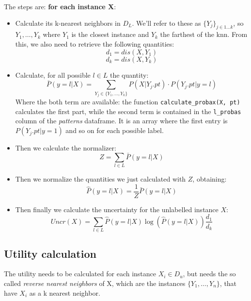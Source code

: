 The steps are: \textbf{for each instance X}:
\begin{itemize}
    \item Calculate its k-nearest neighbors in $D_L$. We'll refer to these as 
    $\{Y_j\}_{j\in 1\dots k}$, so ${Y_1, \dots, Y_k}$ where $Y_1$ is the closest instance and $Y_k$ the 
    farthest of the k\-nn.
    From this, we also need to retrieve the following quantities:
    \begin{equation}
        d_1 = dis(X, Y_1) 
    \end{equation}
    \begin{equation}
        d_k = dis(X, Y_k) 
    \end{equation}

    \item  Calculate, for all possible $l \in L$ the quantity:
    \begin{equation}
        \bar{P}(y = l | X) = \sum_{Y_j \in \{Y_1, \dots, Y_k\}} P(X | Y_j.pt) \cdot P(Y_j.pt | y = l)
        \label{eq:eq_utile}
    \end{equation}
    Where the both term are available: the function \texttt{calculate\_probax(X, pt)} calculates the 
    first part, while the second term is contained in the \texttt{l\_probas} column of the 
    \textit{patterns} dataframe. It is an array where the first entry is $P(Y_j.pt | y = 1)$ and 
    so on for each possible label.
    \item Then we calculate the normalizer:
    \begin{equation}
        Z = \sum_{l \in L} \bar{P}(y = l | X)
    \end{equation}
    \item Then we normalize the quantities we just calculated with $Z$, obtaining:
    \begin{equation}
        \hat{P}(y = l | X) = \frac{1}{Z}  \bar{P}(y = l | X)
    \end{equation}
    \item Then finally we calculate the uncertainty for the unlabelled instance $X$:
    \begin{equation}
        Uncr(X) = \sum_{l \in L} \hat{P}(y = l | X) \log \left( 
                \hat{P}(y = l | X)
        \right) \frac{d_1}{d_k}
    \end{equation}
\end{itemize}

\subsection{Utility calculation}
The utility needs to be calculated for each instance $X_i \in D_u$, but needs the so called 
\textit{reverse nearest neighbors} of X, which are the instances $\{Y_1, \dots, Y_n\}$, 
that have $X_i$ as a k nearest neighbor.

